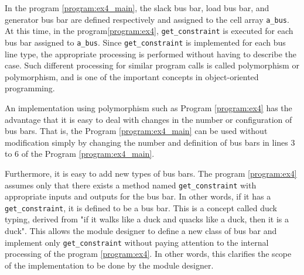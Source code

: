 \documentclass[tombow,dvipdfmx]{corona-a5-1.1}
\begin{document}
\begin{例}
In the program \nobreak\ref{program:ex4_main}, the slack bus bar, load bus bar, and generator bus bar are defined respectively and assigned to the cell array \verb|a_bus|.
At this time, in the program\nobreak\ref{program:ex4}, \verb|get_constraint| is executed for each bus bar assigned to \verb|a_bus|.
Since \verb|get_constraint| is implemented for each bus line type, the appropriate processing is performed without having to describe the case.
Such different processing for similar program calls is called {polymorphism} or {polymorphism}, and is one of the important concepts in object-oriented programming.

An implementation using polymorphism such as Program \nobreak\ref{program:ex4} has the advantage that it is easy to deal with changes in the number or configuration of bus bars.
That is, the Program \nobreak\ref{program:ex4_main} can be used without modification simply by changing the number and definition of bus bars in lines 3 to 6 of the Program \nobreak\ref{program:ex4_main}.

Furthermore, it is easy to add new types of bus bars.
The program \nobreak\ref{program:ex4} assumes only that there exists a method named \verb|get_constraint| with appropriate inputs and outputs for the bus bar.
In other words, if it has a \verb|get_constraint|, it is defined to be a bus bar.
This is a concept called duck typing, derived from "if it walks like a duck and quacks like a duck, then it is a duck".
This allows the module designer to define a new class of bus bar and implement only \verb|get_constraint| without paying attention to the internal processing of the program \nobreak\ref{program:ex4}.
In other words, this clarifies the scope of the implementation to be done by the module designer.
\end{例}
\end{document}
